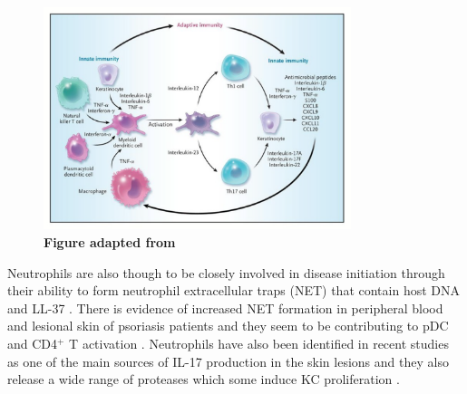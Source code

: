 \begin{figure}[htbp]
\centering
\includegraphics[width=0.8\textwidth]{./Introduction/pdfs/PSO_adaptive_innate_immune_system_crosstalk.pdf}
\caption[Crosstalk between innate and adaptive immunity in psoriasis]{\textbf{Figure adapted from \parencite{Nestle2009}}}
\label{fig:PSO_immune_system_diagram}
\end{figure}


Neutrophils are also though to be closely involved in disease initiation through their ability to form neutrophil extracellular traps (NET) that contain host DNA and LL-37 \parencite{Hu2016}. There is evidence of increased NET formation in peripheral blood and lesional skin of psoriasis patients and they seem to be contributing to pDC and CD4$^+$ T activation \parencite{Hu2016}. Neutrophils have also been identified in recent studies as one of the main sources of IL-17 production in the skin lesions \parencite{Lin2011} and they also release a wide range of proteases which some induce KC proliferation \parencite{Mahil2006}.


%
%


